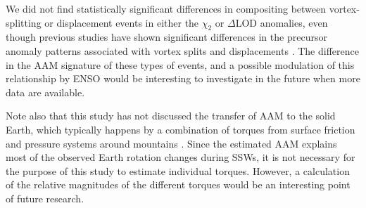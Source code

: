 \documentclass[draft,jgrga]{agutex}
\begin{document}
\begin{article}
 {We did not find statistically significant differences in compositing between vortex-splitting or displacement events in either the $\chi_2$ or $\Delta$LOD anomalies, even though previous studies have shown significant differences in the precursor  anomaly patterns associated with vortex splits and displacements} \citep{martiusetal2009, Mitchell2012}.  
 {The difference in the AAM signature of these types of events, and a possible modulation of this relationship by ENSO} \citep{Barriopedro2014}  {would be interesting to investigate in the future when more data are available.}

Note also that this study has not discussed the transfer of AAM to the solid Earth, which typically happens by a combination of torques from surface friction and  {pressure systems around} mountains \citep{Egger2007}. 
Since the estimated AAM explains most of the observed Earth rotation changes during SSWs, it is not necessary for the purpose of this study to estimate individual torques.  
However, a calculation of the relative magnitudes of the different torques would be an interesting point of future research.  


% 




%
%
%
%
%


\end{article}
\end{document}
